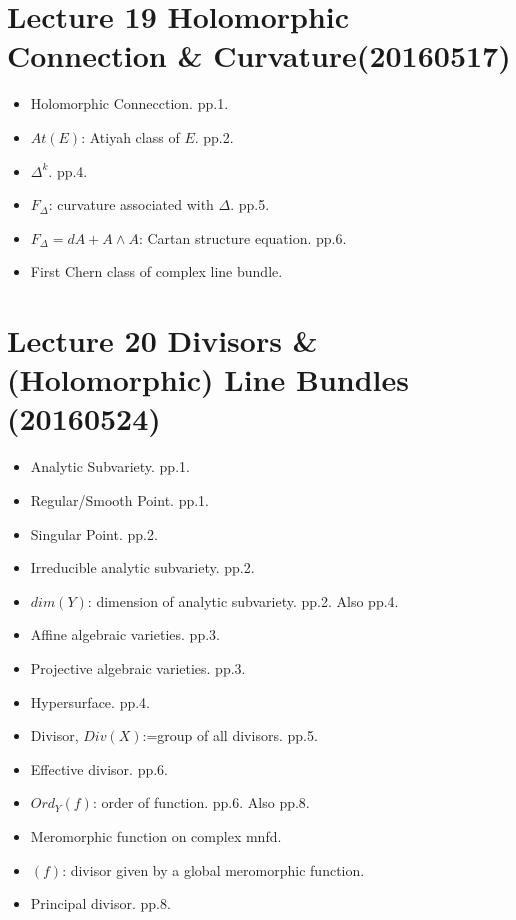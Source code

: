 \documentclass{book}
\numberwithin{equation}{subsection} %
\theoremstyle{definition}
\begin{document}
\section{Lecture 19 Holomorphic Connection \& Curvature(20160517)}
\begin{itemize}
    \item Holomorphic Connecction. pp.1.
    \item $At(E)$: Atiyah class of $E$. pp.2.
    \item $\Delta^k$. pp.4.
    \item $F_\Delta$: curvature associated with $\Delta$. pp.5.
    \item $F_\Delta = dA + A\wedge A$: Cartan structure equation. pp.6.
    \item First Chern class of complex line bundle.
\end{itemize}

\section{Lecture 20 Divisors \& (Holomorphic) Line Bundles (20160524)}
\begin{itemize}
    \item Analytic Subvariety. pp.1.
    \item Regular/Smooth Point. pp.1.
    \item Singular Point. pp.2.
    \item Irreducible analytic subvariety. pp.2.
    \item $dim(Y)$: dimension of analytic subvariety. pp.2. Also pp.4.
    \item Affine algebraic varieties. pp.3.
    \item Projective algebraic varieties. pp.3.
    \item Hypersurface. pp.4.
    \item Divisor, $Div(X)$:=group of all divisors. pp.5.
    \item Effective divisor. pp.6.
    \item $Ord_Y(f)$: order of function. pp.6. Also pp.8.
    \item Meromorphic function on complex mnfd.
    \item $(f)$: divisor given by a global meromorphic function.
    \item Principal divisor. pp.8.
\end{itemize}
\end{document}
